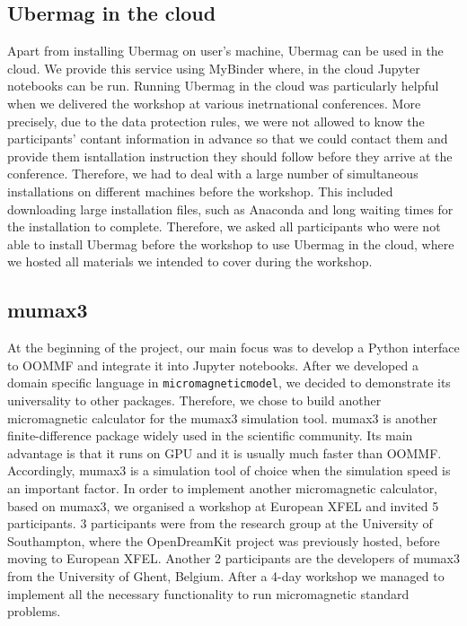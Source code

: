 \documentclass{deliverablereport}
\begin{document}
\subsection{Ubermag in the cloud}

Apart from installing Ubermag on user's machine, Ubermag can be used in the cloud. We provide this service using MyBinder where, in the cloud Jupyter notebooks can be run. Running Ubermag in the cloud was particularly helpful when we delivered the workshop at various inetrnational conferences. More precisely, due to the data protection rules, we were not allowed to know the participants' contant information in advance so that we could contact them and provide them isntallation instruction they should follow before they arrive at the conference. Therefore, we had to deal with a large number of simultaneous installations on different machines before the workshop. This included downloading large installation files, such as Anaconda and long waiting times for the installation to complete. Therefore, we asked all participants who were not able to install Ubermag before the workshop to use Ubermag in the cloud, where we hosted all materials we intended to cover during the workshop. 

\subsection{mumax3}

At the beginning of the project, our main focus was to develop a Python interface to OOMMF and integrate it into Jupyter notebooks. After we developed a domain specific language in \texttt{micromagneticmodel}, we decided to demonstrate its universality to other packages. Therefore, we chose to build another micromagnetic calculator for the mumax3 simulation tool. mumax3 is another finite-difference package widely used in the scientific community. Its main advantage is that it runs on GPU and it is usually much faster than OOMMF. Accordingly, mumax3 is a simulation tool of choice when the simulation speed is an important factor. In order to implement another micromagnetic calculator, based on mumax3, we organised a workshop at European XFEL and invited 5 participants. 3 participants were from the research group at the University of Southampton, where the OpenDreamKit project was previously hosted, before moving to European XFEL. Another 2 participants are the developers of mumax3 from the University of Ghent, Belgium. After a 4-day workshop we managed to implement all the necessary functionality to run micromagnetic standard problems.
\end{document}
